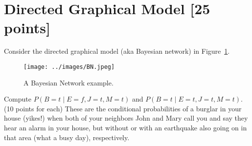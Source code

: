 \documentclass[a4paper]{article}
\theoremstyle{definition}
\begin{document}
\section{Directed Graphical Model [25 points]}
Consider the directed graphical model (aka Bayesian network) in Figure~\ref{fig:bn}.
\begin{figure}[H]
    \centering
    \texttt{[image: ../images/BN.jpeg]}
    \caption{A Bayesian Network example.}
    \label{fig:bn}
\end{figure}
Compute $P(B=t \mid E=f,J=t,M=t)$ and $P(B=t \mid E=t,J=t,M=t)$. (10 points for each) These are the conditional probabilities of a burglar in your house (yikes!) when both of your neighbors John and Mary call you and say they hear an alarm in your house, but without or with an earthquake also going on in that area (what a busy day), respectively.
\end{document}

